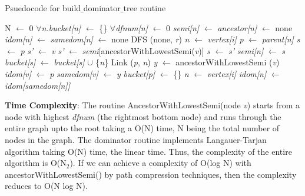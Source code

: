 \documentclass[10pt, oneside, a4paper]{article}
\begin{document}
\begin{algorithm}
\caption{Psuedocode for build$\_$dominator$\_$tree routine}
\label{alg3}
\begin{algorithmic}[1]
\STATE N $\leftarrow$ 0
\STATE $\forall$\emph{n.bucket[n]} $\leftarrow$ \{\}
\STATE $\forall$\emph{dfnum[n]} $\leftarrow$ 0
\STATE \emph{semi[n]} $\leftarrow$ \emph{ancestor[n]} $\leftarrow$ none
\STATE \emph{idom[n]} $\leftarrow$ \emph{samedom[n]} $\leftarrow$ none
\STATE DFS (none, \emph{r})
\STATE \emph{n} $\leftarrow$ \emph{vertex[i]}
\STATE \emph{p} $\leftarrow$ \emph{parent[n]}
\STATE \emph{s} $\leftarrow$ \emph{p}
\STATE \emph{s'} $\leftarrow$ \emph{v}
\ELSE
\STATE \emph{s'} $\leftarrow$ \emph{semi}[ancestorWithLowestSemi(\emph{v})]
\ENDIF
{}
\STATE \emph{s} $\leftarrow$ \emph{s'}
\ENDIF
\ENDFOR
\STATE \emph{semi[n]} $\leftarrow$ \emph{s}
\STATE \emph{bucket[s]} $\leftarrow$ \emph{bucket[s]} $\cup$ \{\emph{n}\}
\STATE Link (\emph{p}, \emph{n})
\STATE \emph{y} $\leftarrow$ ancestorWithLowestSemi (\emph{v})
\STATE \emph{idom[v]} $\leftarrow$ \emph{p}
\ELSE
\STATE \emph{samedom[v]} $\leftarrow$ \emph{y}
\ENDIF
\ENDFOR
\STATE \emph{bucket[p]} $\leftarrow$ \{\}
\ENDFOR
{}
\STATE \emph{n} $\leftarrow$ \emph{vertex[i]}
\STATE \emph{idom[n]} $\leftarrow$ \emph{idom[samedom[n]]}
\ENDIF
\ENDFOR
\end{algorithmic}
\end{algorithm}
\textbf{Time Complexity}:  The routine AncestorWithLowestSemi(node \emph{v}) starts from a node with highest \emph{dfnum} (the rightmost bottom node) and runs through the entire graph upto the root taking a O(N) time, N being the total number of nodes in the graph.  The dominator routine implements Langauer-Tarjan algorithm taking O(N) time, the linear time.  Thus, the complexity of the entire algorithm is O(N$_2$).  If we can achieve a complexity of O(log N) with ancestorWithLowestSemi() by path compression techniques, then the complexity reduces to O(N log N).
\end{document}
